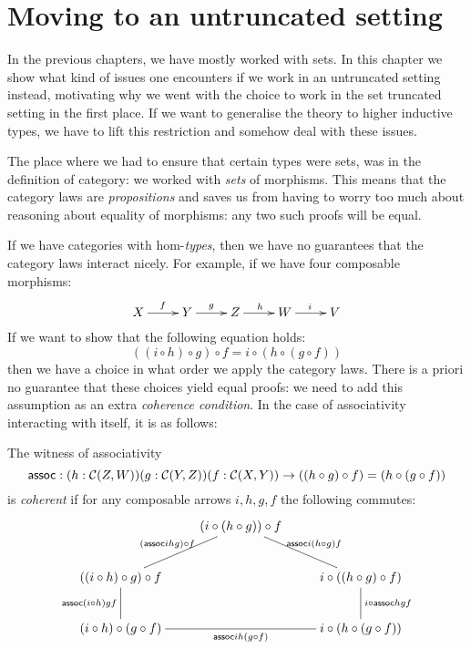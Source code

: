 \chapter{Moving to an untruncated setting}
\label{untruncated}

In the previous chapters, we have mostly worked with sets. In this
chapter we show what kind of issues one encounters if we work in an
untruncated setting instead, motivating why we went with the choice to
work in the set truncated setting in the first place. If we want to
generalise the theory to higher inductive types, we have to lift this
restriction and somehow deal with these issues.

The place where we had to ensure that certain types were sets, was in
the definition of category: we worked with \emph{sets} of
morphisms. This means that the category laws are \emph{propositions}
and saves us from having to worry too much about reasoning about
equality of morphisms: any two such proofs will be equal.

If we have categories with hom-\emph{types}, then we have no
guarantees that the category laws interact nicely. For example, if we
have four composable morphisms:
$$
\xymatrix{
  X \ar[r]^{f} &Y \ar[r]^{g} &Z \ar[r]^{h} &W \ar[r]^{i} &V
}
$$
If we want to show that the following equation holds:
$$
((i \circ h) \circ g) \circ f = i \circ (h \circ (g \circ f))
$$
then we have a choice in what order we apply the category laws. There
is a priori no guarantee that these choices yield equal proofs: we
need to add this assumption as an extra \emph{coherence condition}. In
the case of associativity interacting with itself, it is as follows:

\begin{definition}
  The witness of associativity
  $$
  \assoc : (h : \Cc(Z,W)) (g : \Cc(Y,Z)) (f : \Cc(X,Y)) \to ((h \circ g) \circ f) = (h \circ (g \circ f))
  $$
  is \emph{coherent} if for any composable arrows $i, h, g, f$ the
  following commutes:
  $$
  \xymatrix{
    &(i \circ (h \circ g)) \circ f \ar@{-}[dr]^{\assoc i (h \circ g) f} &\\
    ((i \circ h) \circ g) \circ f \ar@{-}[ur]^{(\assoc i h g) \circ f} \ar@{-}[d]_{\assoc (i \circ h) g f}  &&i \circ ((h \circ g) \circ f) \ar@{-}[d]^{i \circ \assoc h g f}\\
    (i \circ h) \circ (g \circ f) \ar@{-}[rr]_{\assoc i h (g \circ f)} &&i \circ (h \circ (g \circ f))
  }
  $$
\end{definition}

